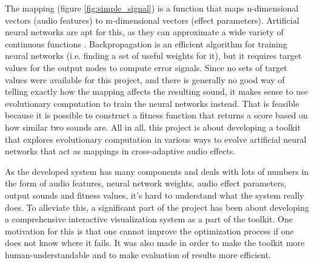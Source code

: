 The mapping (figure \ref{fig:simple_signal}) is a function that maps n-dimensional vectors (audio features) to m-dimensional vectors (effect parameters). Artificial neural networks are apt for this, as they can approximate a wide variety of continuous functions \citep{hornik1991}. Backpropagation \citep{werbos1982, lecun1998} is an efficient algorithm for training neural networks (i.e. finding a set of useful weights for it), but it requires target values for the output nodes to compute error signals. Since no sets of target values were available for this project, and there is generally no good way of telling exactly how the mapping affects the resulting sound, it makes sense to use evolutionary computation to train the neural networks instead. That is feasible because it is possible to construct a fitness function that returns a score based on how similar two sounds are. All in all, this project is about developing a toolkit that explores evolutionary computation in various ways to evolve artificial neural networks that act as mappings in cross-adaptive audio effects.

As the developed system has many components and deals with lots of numbers in the form of audio features, neural network weights, audio effect parameters, output sounds and fitness values, it’s hard to understand what the system really does. To alleviate this, a significant part of the project has been about developing a comprehensive interactive visualization system as a part of the toolkit. One motivation for this is that one cannot improve the optimization process if one does not know where it fails. It was also made in order to make the toolkit more human-understandable and to make evaluation of results more efficient.
